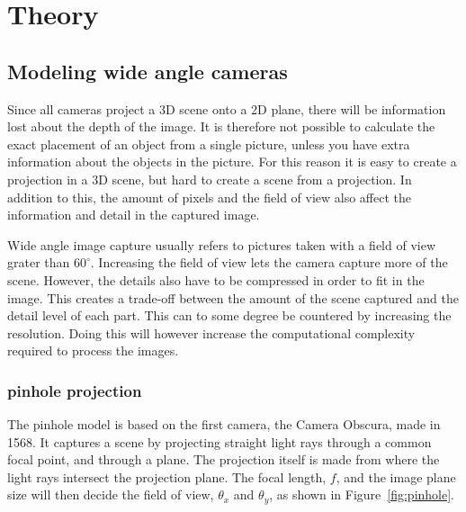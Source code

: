 
\chapter{Theory}
\section{Modeling wide angle cameras}

Since all cameras project a 3D scene onto a 2D plane, there will be information lost about the depth of the image. It is therefore not possible to calculate the exact placement of an object from a single picture, unless you have extra information about the objects in the picture. For this reason it is easy to create a projection in a 3D scene, but hard to create a scene from a projection. In addition to this, the amount of pixels and the field of view also affect the information and detail in the captured image.

Wide angle image capture usually refers to pictures taken with a field of view grater than $60^\circ$. Increasing the field of view lets the camera capture more of the scene. However, the details also have to be compressed in order to fit in the image. This creates a trade-off between the amount of the scene captured and the detail level of each part. This can to some degree be countered by increasing the resolution. Doing this will however increase the computational complexity required to process the images.

\subsection{pinhole projection}
The pinhole model is based on the first camera, the Camera Obscura, made in 1568. It captures a scene by projecting straight light rays through a common focal point, and through a plane. The projection itself is made from where the light rays intersect the projection plane. The focal length, $f$, and the image plane size will then decide the field of view, $\theta_x$ and $\theta_y$, as shown in Figure~\ref{fig:pinhole}. 

